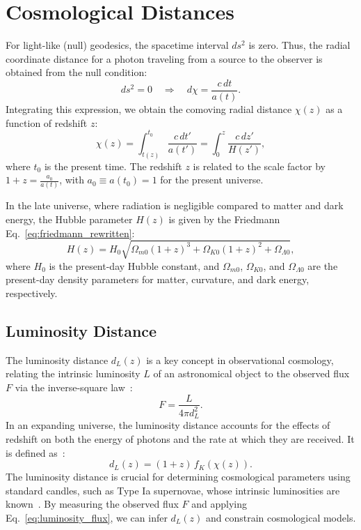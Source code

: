 \section{Cosmological Distances}
For light-like (null) geodesics, the spacetime interval \( ds^2 \) is zero. Thus, the radial coordinate distance for a photon traveling from a source to the observer is obtained from the null condition:
\begin{equation}
    ds^2 = 0 \quad \Rightarrow \quad d\chi = \frac{c \, dt}{a(t)}.
    \label{eq:null_geodesic_condition}
\end{equation}
Integrating this expression, we obtain the comoving radial distance \( \chi(z) \) as a function of redshift \( z \):
\begin{equation}
    \chi(z) = \int_{t(z)}^{t_0} \frac{c \, dt'}{a(t')} = \int_{0}^{z} \frac{c \, dz'}{H(z')},
    \label{eq:comoving_radial_distance}
\end{equation}
where \( t_0 \) is the present time. The redshift \( z \) is related to the scale factor by \( 1 + z = \tfrac{a_0}{a(t)} \), with \( a_0 \equiv a(t_0) = 1 \) for the present universe.

In the late universe, where radiation is negligible compared to matter and dark energy, the Hubble parameter \( H(z) \) is given by the Friedmann Eq.~\eqref{eq:friedmann_rewritten}:
\begin{equation}
    H(z) = H_0 \sqrt{\Omega_{m0}(1+z)^3 + \Omega_{K0}(1+z)^2 + \Omega_{\Lambda0}},
    \label{eq:hubble_parameter_late_universe}
\end{equation}
where \( H_0 \) is the present-day Hubble constant, and \( \Omega_{m0} \), \( \Omega_{K0} \), and \( \Omega_{\Lambda0} \) are the present-day density parameters for matter, curvature, and dark energy, respectively.

\subsection{Luminosity Distance}
The luminosity distance \( d_L(z) \) is a key concept in observational cosmology, relating the intrinsic luminosity \( L \) of an astronomical object to the observed flux \( F \) via the inverse-square law~\citep{1992ARA&A..30..499C}:
\begin{equation}
    F = \frac{L}{4\pi d_L^2}.
    \label{eq:luminosity_flux}
\end{equation}
In an expanding universe, the luminosity distance accounts for the effects of redshift on both the energy of photons and the rate at which they are received. It is defined as~\citep{1999astro.ph..5116H}:
\begin{equation}
    d_L(z) = (1 + z) \, f_K(\chi(z)).
    \label{eq:luminosity_distance}
\end{equation}
The luminosity distance is crucial for determining cosmological parameters using standard candles, such as Type Ia supernovae, whose intrinsic luminosities are known~\cite{1998AJ....116.1009R}. By measuring the observed flux \( F \) and applying Eq.~\eqref{eq:luminosity_flux}, we can infer \( d_L(z) \) and constrain cosmological models.

